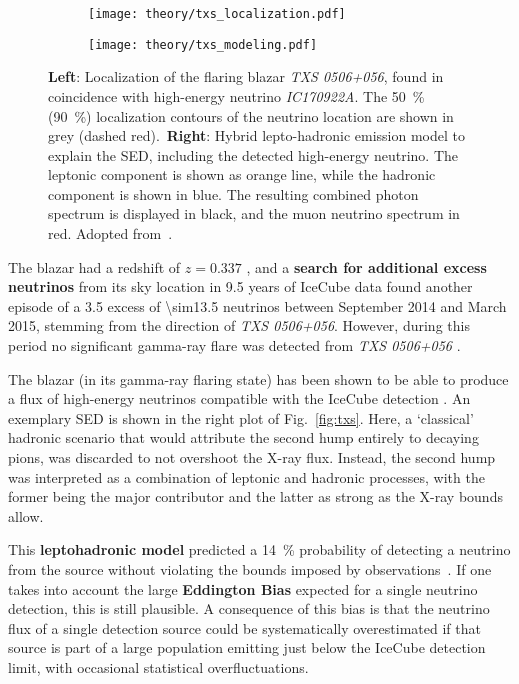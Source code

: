 \begin{figure}[htb]
    \centering
    \begin{subfigure}[b]{0.47\textwidth}
        \centering
        \texttt{[image: theory/txs\_localization.pdf]}
    \end{subfigure}
    \begin{subfigure}[b]{0.52\textwidth}
        \centering
        \texttt{[image: theory/txs\_modeling.pdf]}
    \end{subfigure}
    \caption[TXS 0506+056: Localization and SED]{\textbf{Left}: Localization of the flaring blazar \emph{TXS 0506+056}, found in coincidence with high-energy neutrino \emph{IC170922A}. The \SI{50}{\percent} (\SI{90}{\percent}) localization contours of the neutrino location are shown in grey (dashed red).\ \textbf{Right}: Hybrid lepto-hadronic emission model to explain the SED, including the detected high-energy neutrino. The leptonic component is shown as orange line, while the hadronic component is shown in blue. The resulting combined photon spectrum is displayed in black, and the muon neutrino spectrum in red. Adopted from~\cite{Aartsen2018, Gao2018}.}
\end{figure}

The blazar had a redshift of $z=0.337$ , and a \textbf{search for additional excess neutrinos} from its sky location in 9.5 years of IceCube data found another episode of a \SI{3.5}{\sigma} excess of \num{\sim13.5} neutrinos between September 2014 and March 2015, stemming from the direction of \emph{TXS 0506+056}. However, during this period no significant gamma-ray flare was detected from \emph{TXS 0506+056} .

The blazar (in its gamma-ray flaring state) has been shown to be able to produce a flux of high-energy neutrinos compatible with the IceCube detection . An exemplary SED is shown in the right plot of Fig.~\ref{fig:txs}. Here, a `classical' hadronic scenario that would attribute the second hump entirely to decaying pions, was discarded to not overshoot the X-ray flux. Instead, the second hump was interpreted as a combination of leptonic and hadronic processes, with the former being the major contributor and the latter as strong as the X-ray bounds allow.

This \textbf{leptohadronic model} predicted a \SI{14}{\percent} probability of detecting a neutrino from the source without violating the bounds imposed by observations~\cite{Gao2018}. If one takes into account the large \textbf{Eddington Bias}  expected for a single neutrino detection, this is still plausible. A consequence of this bias is that the neutrino flux of a single detection source could be systematically overestimated if that source is part of a large population emitting just below the IceCube detection limit, with occasional statistical overfluctuations.

